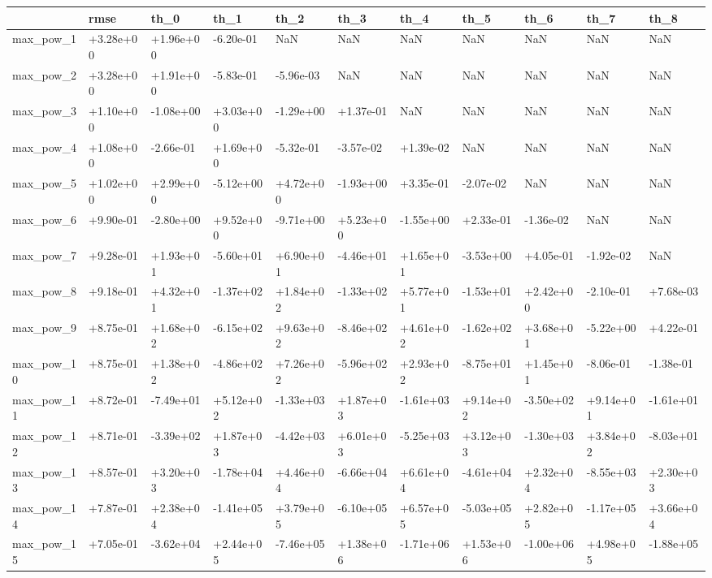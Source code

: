 \begin{tabular}{lllllllllll}
\toprule
{} &      rmse &      th\_0 &      th\_1 &      th\_2 &      th\_3 &      th\_4 &      th\_5 &      th\_6 &      th\_7 &      th\_8 \\
\midrule
max\_pow\_1  & +3.28e+00 & +1.96e+00 & -6.20e-01 &       NaN &       NaN &       NaN &       NaN &       NaN &       NaN &       NaN \\
max\_pow\_2  & +3.28e+00 & +1.91e+00 & -5.83e-01 & -5.96e-03 &       NaN &       NaN &       NaN &       NaN &       NaN &       NaN \\
max\_pow\_3  & +1.10e+00 & -1.08e+00 & +3.03e+00 & -1.29e+00 & +1.37e-01 &       NaN &       NaN &       NaN &       NaN &       NaN \\
max\_pow\_4  & +1.08e+00 & -2.66e-01 & +1.69e+00 & -5.32e-01 & -3.57e-02 & +1.39e-02 &       NaN &       NaN &       NaN &       NaN \\
max\_pow\_5  & +1.02e+00 & +2.99e+00 & -5.12e+00 & +4.72e+00 & -1.93e+00 & +3.35e-01 & -2.07e-02 &       NaN &       NaN &       NaN \\
max\_pow\_6  & +9.90e-01 & -2.80e+00 & +9.52e+00 & -9.71e+00 & +5.23e+00 & -1.55e+00 & +2.33e-01 & -1.36e-02 &       NaN &       NaN \\
max\_pow\_7  & +9.28e-01 & +1.93e+01 & -5.60e+01 & +6.90e+01 & -4.46e+01 & +1.65e+01 & -3.53e+00 & +4.05e-01 & -1.92e-02 &       NaN \\
max\_pow\_8  & +9.18e-01 & +4.32e+01 & -1.37e+02 & +1.84e+02 & -1.33e+02 & +5.77e+01 & -1.53e+01 & +2.42e+00 & -2.10e-01 & +7.68e-03 \\
max\_pow\_9  & +8.75e-01 & +1.68e+02 & -6.15e+02 & +9.63e+02 & -8.46e+02 & +4.61e+02 & -1.62e+02 & +3.68e+01 & -5.22e+00 & +4.22e-01 \\
max\_pow\_10 & +8.75e-01 & +1.38e+02 & -4.86e+02 & +7.26e+02 & -5.96e+02 & +2.93e+02 & -8.75e+01 & +1.45e+01 & -8.06e-01 & -1.38e-01 \\
max\_pow\_11 & +8.72e-01 & -7.49e+01 & +5.12e+02 & -1.33e+03 & +1.87e+03 & -1.61e+03 & +9.14e+02 & -3.50e+02 & +9.14e+01 & -1.61e+01 \\
max\_pow\_12 & +8.71e-01 & -3.39e+02 & +1.87e+03 & -4.42e+03 & +6.01e+03 & -5.25e+03 & +3.12e+03 & -1.30e+03 & +3.84e+02 & -8.03e+01 \\
max\_pow\_13 & +8.57e-01 & +3.20e+03 & -1.78e+04 & +4.46e+04 & -6.66e+04 & +6.61e+04 & -4.61e+04 & +2.32e+04 & -8.55e+03 & +2.30e+03 \\
max\_pow\_14 & +7.87e-01 & +2.38e+04 & -1.41e+05 & +3.79e+05 & -6.10e+05 & +6.57e+05 & -5.03e+05 & +2.82e+05 & -1.17e+05 & +3.66e+04 \\
max\_pow\_15 & +7.05e-01 & -3.62e+04 & +2.44e+05 & -7.46e+05 & +1.38e+06 & -1.71e+06 & +1.53e+06 & -1.00e+06 & +4.98e+05 & -1.88e+05 \\
\bottomrule
\end{tabular}
